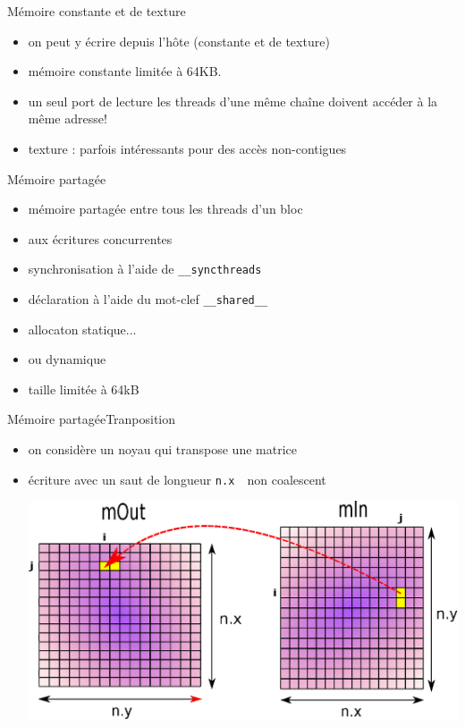 \documentclass[11pt,mathserif]{beamer}
\newcommand{\scout}{\faAngellist}
\newcommand{\gezi}{\faLongArrowRight}
\newcommand{\argi}{\faLightbulbO}
\newcommand{\kontuz}{\faExclamationTriangle}
\newcommand{\triste}{\faFrownO}
\newcommand{\adibi}{\faCommentO}
\newcommand{\harritu}{\faExclamation}
\begin{document}
\begin{frame}{Mémoire constante et de texture}
  \begin{itemize}[<+->]
    \item[\argi] on peut y écrire depuis l'hôte (constante et de texture)
    \item[\scout] mémoire constante limitée à 64KB. 
    \item[\kontuz] un seul port de lecture \gezi les threads d'une même chaîne doivent accéder à la même adresse!
    \item[\scout] texture : parfois intéressants pour des accès non-contigues
   \end{itemize}
\end{frame}

\begin{frame}{Mémoire partagée}
  \begin{itemize}[<+->]
    \item[\argi] mémoire partagée entre tous les threads d'un bloc
    \item[\kontuz] aux écritures concurrentes \harritu
    \item[\scout] synchronisation à l'aide de {\tt \_\_syncthreads } 
    \item[\scout] déclaration à l'aide du mot-clef {\tt \_\_shared\_\_}
    \item[\scout] allocaton statique...
  
\item[\scout] ou dynamique
  
   \item[\kontuz] taille limitée à 64kB
   \end{itemize}
\end{frame}

\begin{frame}{Mémoire partagée}{Tranposition}
  \begin{itemize}[<+->]
    \item[\adibi] on considère un noyau qui transpose une matrice
  
    \item[\triste] écriture avec un saut de longueur {\tt n.x }\gezi\ non coalescent \harritu
\begin{center}
  \includegraphics[width=0.7\linewidth]{fig/transpose1.eps}
\end{center}
   \end{itemize}
\end{frame}
\end{document}
